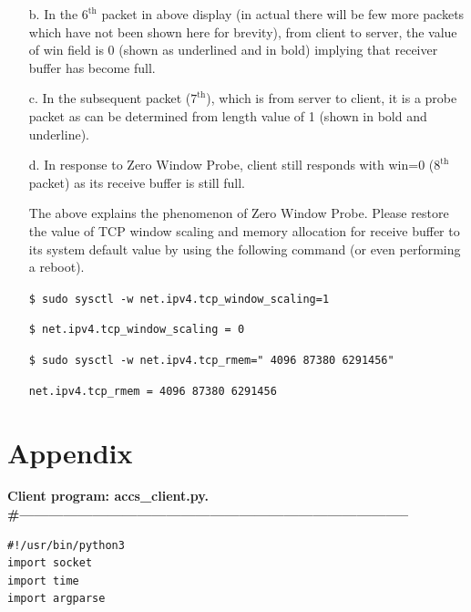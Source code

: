 \begin{multicols}{2}
\begin{itemize}
21:20:12.495002 IP 10.211.55.10.60910 $>$\\ 10.211.55.2.9999: Flags [.], ack 2737, \underline{\textbf{win 0}}, options [nop,nop,TS val 2062596 ecr 782929083], length 0

21:20:17.900971 IP 10.211.55.2.9999 $>$\\ 10.211.55.10.60910: Flags [.], seq 2737:2738, ack 1, win 65535, options [nop,nop,TS val 782934455 ecr 2062596], \underline{\textbf{length 1}}

21:20:17.901014 IP 10.211.55.10.60910 $>$\\ 10.211.55.2.9999: Flags [.], ack 2737, \underline{\textbf{win 0}}, options [nop,nop,TS val 2063948 ecr 782934455], length 0


\item[b.] In the $6^{\text {th}}$ packet in above display (in actual there will be few more packets which have not been shown here for brevity), from client to server, the value of win field is 0 (shown as underlined and in bold) implying that receiver buffer has become full.

\item[c.] In the subsequent packet ($7^{\text {th}}$), which is from server to client, it is a probe packet as can be determined from length value of 1 (shown in bold and underline).

\item[d.] In response to Zero Window Probe, client still responds with win=0 ($8^{\text{th}}$ packet) as its receive buffer is still full. 

The above explains the phenomenon of Zero Window Probe. Please restore the value of TCP window scaling and memory allocation for receive buffer to its system default value by using the following command (or even performing a reboot).

\texttt{\$ sudo sysctl -w net.ipv4.tcp\_window\_scaling=1}

\texttt{\$ net.ipv4.tcp\_window\_scaling = 0}

\texttt{\$ sudo sysctl -w net.ipv4.tcp\_rmem=" 4096 87380 6291456"}

\texttt{net.ipv4.tcp\_rmem = 4096 87380 6291456}
\end{itemize}

\section*{Appendix}
{\lstset{xleftmargin=1cm}
{\bf Client program: accs\_client.py.}\\
{\bf \#--------------------------------------------------------------------------------}
\begin{lstlisting}[language=Caml,basicstyle=\small]
#!/usr/bin/python3
import socket
import time
import argparse


\end{lstlisting}}
\end{multicols}
